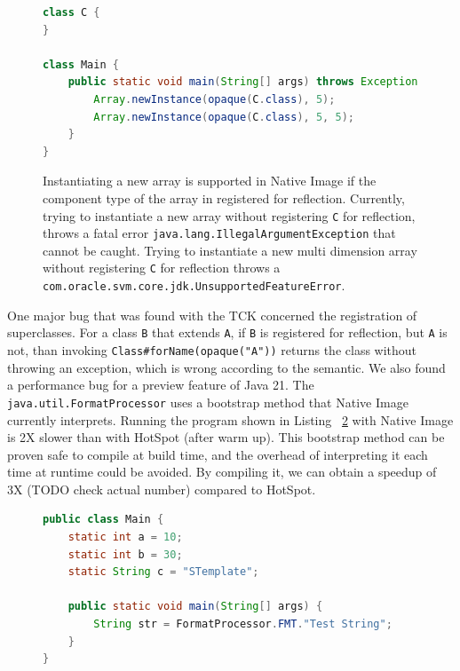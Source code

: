 \begin{figure}[ht]
    \centering
\begin{lstlisting}[language=Java]
class C {
}

class Main {
    public static void main(String[] args) throws Exception {
        Array.newInstance(opaque(C.class), 5);
        Array.newInstance(opaque(C.class), 5, 5);
    }
}
\end{lstlisting}
    \caption{Instantiating a new array is supported in Native Image if the component type of the array in registered for reflection. Currently, trying to instantiate a new array without registering \texttt{C} for reflection, throws a fatal error \texttt{java.lang.IllegalArgumentException} that cannot be caught. Trying to instantiate a new multi dimension array without registering \texttt{C} for reflection throws a \texttt{com.oracle.svm.core.jdk.UnsupportedFeatureError}.}
    \label{fig:new_multi_array_bug}
\end{figure}

One major bug that was found with the TCK concerned the registration of superclasses. For a class \verb|B| that extends \verb|A|, if \verb|B| is registered for reflection, but \verb|A| is not, than invoking \verb|Class#forName(opaque("A"))| returns the class without throwing an exception, which is wrong according to the semantic. 
We also found a performance bug for a preview feature of Java 21. The \verb|java.util.FormatProcessor| uses a bootstrap method that Native Image currently interprets. Running the program shown in Listing ~\ref{fig:format_processor} with Native Image is 2X slower than with HotSpot (after warm up). This bootstrap method can be proven safe to compile at build time, and the overhead of interpreting it each time at runtime could be avoided. By compiling it, we can obtain a speedup of 3X (TODO check actual number) compared to HotSpot.

\begin{figure}[ht]
    \centering
\begin{lstlisting}[language=Java]
public class Main {
    static int a = 10;
    static int b = 30;
    static String c = "STemplate";

    public static void main(String[] args) {
        String str = FormatProcessor.FMT."Test String";
    }
}
\end{lstlisting}
    \caption{}
    \label{fig:format_processor}
\end{figure}



